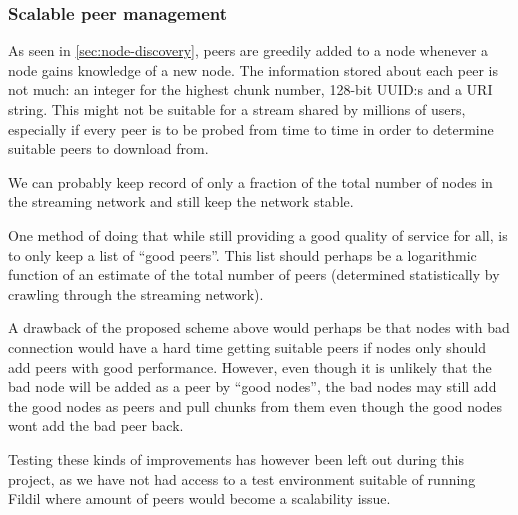 \documentclass[10pt, a4paper]{article}
\begin{document}
\subsubsection{Scalable peer management}

As seen in \autoref{sec:node-discovery}, peers are greedily added to a
node whenever a node gains knowledge of a new node. The information
stored about each peer is not much: an integer for the highest chunk
number, 128-bit UUID:s and a URI string. This might not be suitable
for a stream shared by millions of users, especially if every peer is
to be probed from time to time in order to determine suitable peers to
download from.

We can probably keep record of only a fraction of the total number of
nodes in the streaming network and still keep the network stable.

One method of doing that while still providing a good quality of
service for all, is to only keep a list of ``good peers''. This list
should perhaps be a logarithmic function of an estimate of the total
number of peers (determined statistically by crawling through the
streaming network).

A drawback of the proposed scheme above would perhaps be that nodes
with bad connection would have a hard time getting suitable peers if
nodes only should add peers with good performance. However, even
though it is unlikely that the bad node will be added as a peer by
``good nodes'', the bad nodes may still add the good nodes as peers
and pull chunks from them even though the good nodes wont add the bad
peer back.

Testing these kinds of improvements has however been left out during
this project, as we have not had access to a test environment suitable
of running Fildil where amount of peers would become a scalability
issue.

\newpage


\end{document}
